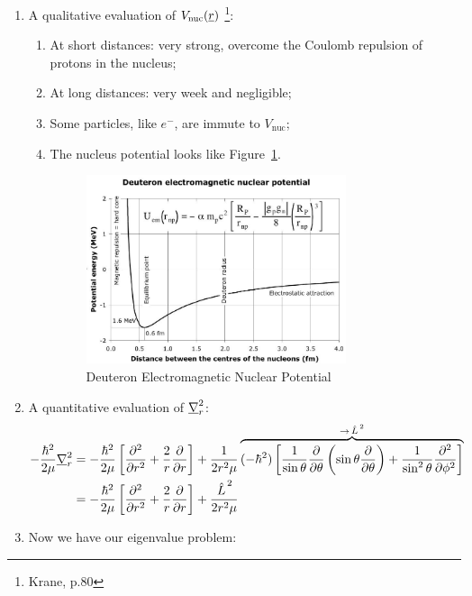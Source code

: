 \documentclass{school-22.101-notes}
\begin{document}
\begin{enumerate}
\item A qualitative evaluation of $V_{\mathrm{nuc}} (\underline{r})$ \footnote{Krane, p.80}: 
    \begin{enumerate}
    \item At short distances: very strong, overcome the Coulomb repulsion of protons in the nucleus; 
    \item At long distances: very week and negligible; 
    \item Some particles, like $e^-$, are immute to $V_{\mathrm{nuc}}$;
    \item The nucleus potential looks like Figure~\ref{nuclear-potential-radius}. 
    \begin{figure}
        \centering
        \includegraphics[width=3in]{images/deuteron/nuclear-potential-radius.png}
        \caption{Deuteron Electromagnetic Nuclear Potential\label{nuclear-potential-radius}}
    \end{figure}
    \end{enumerate}

\item A quantitative evaluation of $\underline{\nabla}_r^2$: 
\begin{align}
- \frac{\hbar^2}{2 \mu} \underline{\nabla}_r^2 &= - \frac{\hbar^2}{2 \mu} \left[ \frac{\partial^{2} }{\partial r ^{2}} + \frac{2}{r} \frac{\partial}{\partial r} \right] + \frac{1}{2 r^2 \mu} \overbrace{ (-\hbar^2) \left[ \frac{1}{\sin \theta} \frac{\partial}{\partial \theta} \left( \sin \theta \frac{\partial}{\partial \theta} \right) + \frac{1}{\sin^2 \theta} \frac{\partial^{2} }{\partial \phi ^{2}} \right]}^{\to \left. \hat{L} \right.^2}  \\
&= - \frac{\hbar^2}{2 \mu} \left[ \frac{\partial^{2} }{\partial r ^{2}} + \frac{2}{r} \frac{\partial}{\partial r} \right] + \frac{\left. \hat{L} \right.^2}{2 r^2 \mu} 
\end{align}

\item Now we have our eigenvalue problem:


\end{enumerate}
\end{document}
